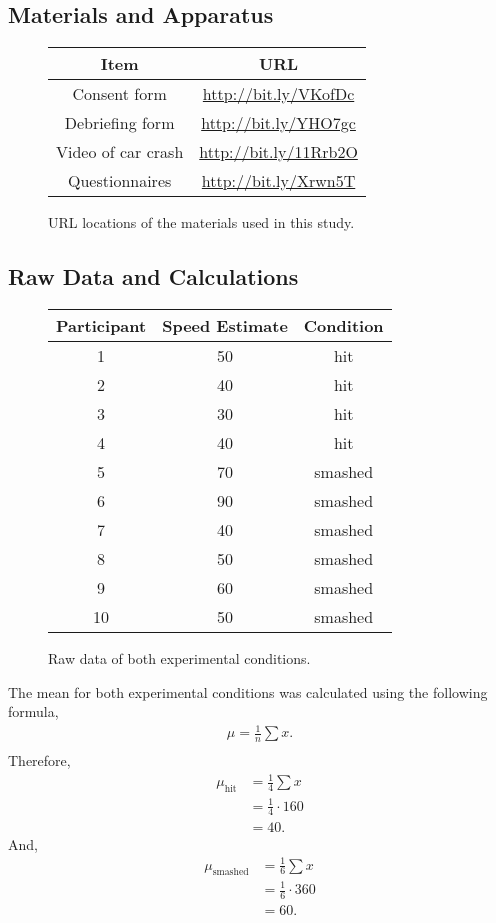 \documentclass[a4paper,twocolumn]{report}
\begin{document}
\subsection{Materials and Apparatus}

\begin{figure}[h]
\begin{center}
\begin{tabular}{cc}
\toprule
Item & URL\\
\midrule
Consent form & \url{http://bit.ly/VKofDc}\\
Debriefing form & \url{http://bit.ly/YHO7gc}\\
Video of car crash & \url{http://bit.ly/11Rrb2O}\\
Questionnaires & \url{http://bit.ly/Xrwn5T}\\
\bottomrule
\end{tabular}
\end{center}
\caption{URL locations of the materials used in this study.}
\end{figure}

\subsection{Raw Data and Calculations}

\begin{figure}[h]
\begin{center}
\begin{tabular}{ccc}
\toprule
Participant & Speed Estimate & Condition\\
\midrule
1 & 50 & hit\\
2 & 40 & hit\\
3 & 30 & hit\\
4 & 40 & hit\\
5 & 70 & smashed\\
6 & 90 & smashed\\
7 & 40 & smashed\\
8 & 50 & smashed\\
9 & 60 & smashed\\
10& 50 & smashed\\
\bottomrule
\end{tabular}
\end{center}
\caption{Raw data of both experimental conditions.}
\end{figure}

The mean for both experimental conditions was calculated using the following
formula,
\begin{align*}
    \mu = \frac{1}{n}\sum{x}.\\
\end{align*}
Therefore,
\begin{align*}
    \mu_{\text{hit}} &= \frac{1}{4}\sum{x}\\
    &= \frac{1}{4} \cdot 160\\
    &= 40.
\end{align*}
And,
\begin{align*}
    \mu_{\text{smashed}} &= \frac{1}{6}\sum{x}\\
    &= \frac{1}{6} \cdot 360\\
    &= 60.
\end{align*}
\end{document}
